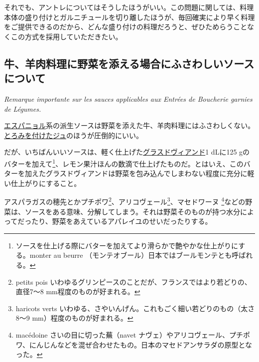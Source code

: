 それでも、アントレについてはそうしたほうがいい。この問題に関しては、料理本体の盛り付けとガルニチュールを切り離したほうが、毎回確実により早く料理をご提供できるのだから、どんな盛り付けの料理だろうと、ぜひためらうことなくこの方式を採用していただきたい。

\hypertarget{remarque-importante-sur-les-sauces-applicables-aux-entrees-de-boucherie-garnie-de-legumes}{%
\subsection{牛、羊肉料理に野菜を添える場合にふさわしいソースについて}\label{remarque-importante-sur-les-sauces-applicables-aux-entrees-de-boucherie-garnie-de-legumes}}

\vspace{-1\zw}
\begin{center}
\textit{Remarque importante sur les sauces applicables aux Entrées de Boucherie garnies de Légumes.}
\end{center}


\vspace{1\zw}

\protect\hyperlink{sauce-espagnole}{エスパニョル}系の派生ソースは野菜を添えた牛、羊肉料理にはふさわしくない。\protect\hyperlink{jus-de-veau-lie}{とろみを付けたジュ}のほうが圧倒的にいい。

だが、いちばんいいソースは、軽く仕上げた\protect\hyperlink{glace-de-viande}{グラスドヴィアンド}1
dLに125 gのバターを加えて\footnote{ソースを仕上げる際にバターを加えてより滑らかで艶やかな仕上がりにする。monter
  au beurre （モンテオブール）日本ではブールモンテとも呼ばれる。}、レモン果汁ほんの数滴で仕上げたものだ。とはいえ、このバターを加えたグラスドヴィアンドは野菜を包み込んでしまわない程度に充分に軽い仕上がりにすること。

アスパラガスの穂先とかプチポワ\footnote{petits pois
  いわゆるグリンピースのことだが、フランスではより若どりの、直径7〜8
  mm程度のものが好まれる。}、アリコヴェール\footnote{haricots verts
  いわゆる、さやいんげん。これもごく細い若どりのもの（太さ8〜9
  mm）程度のものが好まれる。}、マセドワーヌ \footnote{macédoine
  さいの目に切った蕪（navet
  ナヴェ）やアリコヴェール、プチポワ、にんじんなどを混ぜ合わせたもの。日本のマセドアンサラダの原型となった。}などの野菜は、ソースをある意味、分解してしまう。それは野菜そのものが持つ水分によってだったり、野菜をあえているアパレイユのせいだったりする。

